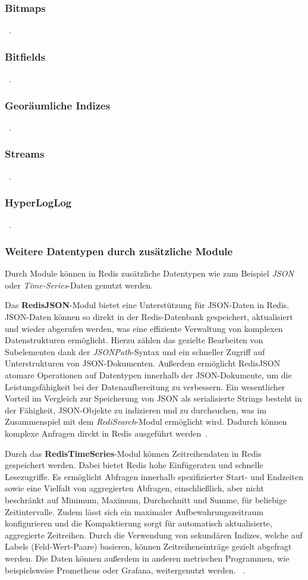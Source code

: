 \subsubsection{Bitmaps}
~\cite{redis_bitmaps_nodate}.
\subsubsection{Bitfields}
~\cite{redis_bitfields_nodate}.
\subsubsection{Georäumliche Indizes}
~\cite{redis_geospatial_nodate}.
\subsubsection{Streams}
~\cite{redis_streams_nodate}.
\subsubsection{HyperLogLog}
~\cite{redis_hyperloglog_nodate}.
\subsubsection{Weitere Datentypen durch zusätzliche Module}
Durch Module können in Redis zusätzliche Datentypen wie zum Beispiel \emph{JSON} oder \emph{Time-Series}-Daten genutzt werden.

Das \textbf{RedisJSON}-Modul bietet eine Unterstützung für JSON-Daten in Redis.
JSON-Daten können so direkt in der Redis-Datenbank gespeichert, aktualisiert und wieder abgerufen werden, was eine effiziente Verwaltung von komplexen Datenstrukturen ermöglicht. Hierzu zählen das gezielte Bearbeiten von Subelementen dank der \emph{JSONPath}-Syntax und ein schneller Zugriff auf Unterstrukturen von JSON-Dokumenten.
Außerdem ermöglicht RedisJSON atomare Operationen auf Datentypen innerhalb der JSON-Dokumente, um die Leistungsfähigkeit bei der Datenaufbereitung zu verbessern.
Ein wesentlicher Vorteil im Vergleich zur Speicherung von JSON als serialisierte Strings besteht in der Fähigkeit, JSON-Objekte zu indizieren und zu durchsuchen, was im Zusammenspiel mit dem \emph{RediSearch}-Modul ermöglicht wird.
Dadurch können komplexe Anfragen direkt in Redis ausgeführt werden~\cite{redis_json_nodate, redis_json-use-cases_nodate}.

Durch das \textbf{RedisTimeSeries}-Modul können Zeitreihendaten in Redis gespeichert werden.
Dabei bietet Redis hohe Einfügeraten und schnelle Lesezugriffe.
Es ermöglicht Abfragen innerhalb spezifizierter Start- und Endzeiten sowie eine Vielfalt von aggregierten Abfragen, einschließlich, aber nicht beschränkt auf Minimum, Maximum, Durchschnitt und Summe, für beliebige Zeitintervalle.
Zudem lässt sich ein maximaler Aufbewahrungszeitraum konfigurieren und die Kompaktierung sorgt für automatisch aktualisierte, aggregierte Zeitreihen.
Durch die Verwendung von sekundären Indizes, welche auf Labels (Feld-Wert-Paare) basieren, können Zeitreiheneinträge gezielt abgefragt werden.
Die Daten können außerdem in anderen metrischen Programmen, wie beispielsweise Prometheus oder Grafana, weitergenutzt werden.
~\cite{redis_time_nodate}.


